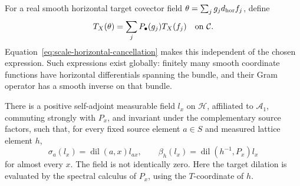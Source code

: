 For a real smooth horizontal target covector field
$\theta=\sum_jg_jd_{\rm hor}f_j$, define
\[
 T_X(\theta)=\sum_jP_{\bullet}(g_j)T_X(f_j)
 \quad\hbox{on }\mathcal C.
\]
Equation~\eqref{eq:scale-horizontal-cancellation} makes this independent
of the chosen expression.  Such expressions exist globally: finitely
many smooth coordinate functions have horizontal differentials
spanning the bundle, and their Gram operator has a smooth inverse on
that bundle.

\begin{lemma}\label{lem:scale-closed-covariance}
There is a positive self-adjoint measurable field $l_x$ on
$\mathcal H$, affiliated to $\mathcal A_1$, commuting strongly with
$P_x$, and invariant under the complementary source factors, such
that, for every fixed source element $a\in S$ and measured lattice
element $h$,
\begin{equation}\label{eq:scale-derivative-modulus-covariance}
 \sigma_a(l_x)=\operatorname{dil}(a,x)l_{ax},\qquad
 \beta_h(l_x)=\operatorname{dil}(h^{-1},P_x)l_x
\end{equation}
for almost every $x$.  The field is not identically zero.
Here the target dilation is evaluated by the spectral calculus of
$P_x$, using the $T$-coordinate of $h$.
\end{lemma}

